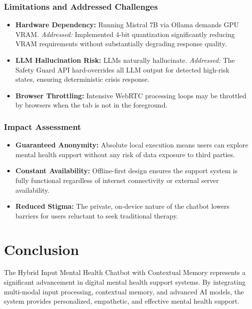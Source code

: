 \documentclass[11pt]{report}
\begin{document}
\subsection{Limitations and Addressed Challenges}
\begin{itemize}
    \item \textbf{Hardware Dependency:} Running Mistral 7B via Ollama demands GPU VRAM. \textit{Addressed:} Implemented 4-bit quantization significantly reducing VRAM requirements without substantially degrading response quality.
    \item \textbf{LLM Hallucination Risk:} LLMs naturally hallucinate. \textit{Addressed:} The Safety Guard API hard-overrides all LLM output for detected high-risk states, ensuring deterministic crisis response.
    \item \textbf{Browser Throttling:} Intensive WebRTC processing loops may be throttled by browsers when the tab is not in the foreground.
\end{itemize}

\subsection{Impact Assessment}
\begin{itemize}
    \item \textbf{Guaranteed Anonymity:} Absolute local execution means users can explore mental health support without any risk of data exposure to third parties.
    \item \textbf{Constant Availability:} Offline-first design ensures the support system is fully functional regardless of internet connectivity or external server availability.
    \item \textbf{Reduced Stigma:} The private, on-device nature of the chatbot lowers barriers for users reluctant to seek traditional therapy.
\end{itemize}

\chapter{Conclusion}
The Hybrid Input Mental Health Chatbot with Contextual Memory represents a significant advancement in digital mental health support systems. By integrating multi-modal input processing, contextual memory, and advanced AI models, the system provides personalized, empathetic, and effective mental health support.
\end{document}
